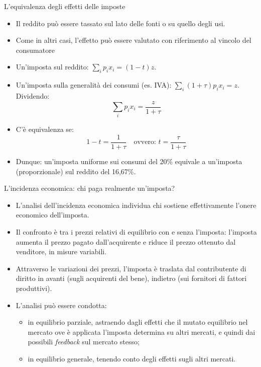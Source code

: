 \documentclass[aspectratio=64,12pt]{beamer}
\begin{document}
\begin{frame}{L'equivalenza degli effetti delle imposte}
\begin{itemize}
\item Il reddito può essere tassato sul lato delle fonti o su quello degli usi.
\item Come in altri casi, l'effetto può essere valutato con riferimento al vincolo
del consumatore
\item Un'imposta sul reddito: $\sum_ip_ix_i=(1-t)z$.
\item Un'imposta sulla generalità dei consumi (es. IVA): $\sum_i(1+\tau)p_ix_i=z$.
Dividendo:
\begin{equation*}
   \sum_ip_ix_i = \frac{z}{1+\tau}
\end{equation*}
\item C'è equivalenza se:
\begin{equation*}
   1-t = \frac{1}{1+\tau} \quad\text{ovvero: }t = \frac{\tau}{1+\tau}
\end{equation*}
\item Dunque: un'imposta uniforme sui consumi del 20\% equivale a un'imposta
(proporzionale) sul reddito del 16,67\%.
\end{itemize}
\end{frame}


\begin{frame}{L'incidenza economica: chi paga realmente un'imposta?}
\begin{itemize}
\item L'analisi dell'incidenza economica individua chi sostiene effettivamente
l'onere economico dell'imposta.
\item Il confronto è tra i \alert{prezzi relativi} di equilibrio con e senza l'imposta:
l'imposta aumenta il prezzo pagato dall'acquirente e riduce il prezzo
ottenuto dal venditore, in misure variabili.
\item Attraverso le variazioni dei prezzi, l'imposta è traslata dal
contributente di diritto \alert{in avanti} (sugli acquirenti del bene), \alert{indietro}
(sui fornitori di fattori produttivi).
\item L'analisi può essere condotta:
\begin{itemize}
\item in \alert{equilibrio parziale}, astraendo dagli effetti che il mutato equilibrio
nel mercato ove è applicata l'imposta determina su altri mercati, e quindi
dai possibili \emph{feedback} sul mercato stesso;
\item in \alert{equilibrio generale}, tenendo conto degli effetti sugli altri mercati.
\end{itemize}
\end{itemize}
\end{frame}
\end{document}
